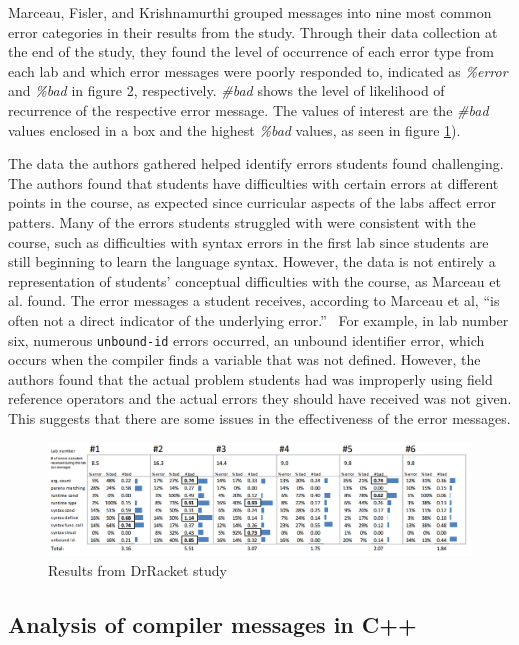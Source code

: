 \documentclass{sig-alternate}
\begin{document}
Marceau, Fisler, and Krishnamurthi grouped messages into nine most common error categories in their results from the study.
Through their data collection at the end of the study, they found the level of occurrence of each error type from each lab and which error messages were poorly responded to, indicated as \textit{\%error} and \textit{\%bad} in figure 2, respectively.
\textit{\#bad} shows the level of likelihood of recurrence of the respective error message.
The values of interest are the \textit{\#bad} values enclosed in a box and the highest \textit{\%bad} values, as seen in figure \ref{fig:drracketstudy}). 

The data the authors gathered helped identify errors students found challenging.
The authors found that students have difficulties with certain errors at different points in the course, as expected since curricular aspects of the labs affect error patters.
Many of the errors students struggled with were consistent with the course, such as difficulties with syntax errors in the first lab since students are still beginning to learn the language syntax.
However, the data is not entirely a representation of students' conceptual difficulties with the course, as Marceau et al. found.
The error messages a student receives, according to Marceau et al, ``is often not a direct indicator of the underlying error.''~\cite{Marceau:2011:MEE:1953163.1953308}
For example, in lab number six, numerous \texttt{unbound-id} errors occurred, an unbound identifier error, which occurs when the compiler finds a variable that was not defined. 
However, the authors found that the actual problem students had was improperly using field reference operators and the actual errors they should have received was not given.
This suggests that there are some issues in the effectiveness of the error messages.

\begin{figure}
  \centering
  \includegraphics[keepaspectratio, width=\textwidth]{MEE_Data.png}
  \caption{Results from DrRacket study}
  \label{fig:drracketstudy}
\end{figure}

\subsection{Analysis of compiler messages in C++}\label{subsec:compiler analysis}
\end{document}
